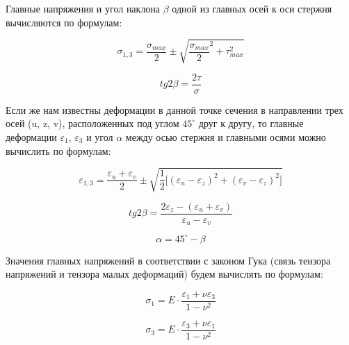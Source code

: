 \documentclass[12pt, a4paper]{article}
\begin{document}
    Главные напряжения и угол наклона $\beta$ одной из главных осей к оси стержня вычисляются по формулам:
    
    \begin{equation}
        \sigma_{1,3} = \frac{\sigma_{max}}{2} \pm \sqrt{\frac{\sigma_{max}}{2}^{2} + \tau_{max}^{2}}
        \label{eq3}
    \end{equation}
    
    \begin{equation}
        tg2\beta = \frac{2\tau}{\sigma}
        \label{eq4}
    \end{equation}
    
    Если же нам известны деформации в данной точке сечения в направлении трех осей (u, z, v), расположенных под углом $45^{\circ}$ друг к другу, то главные деформации $\varepsilon_{1}$, $\varepsilon_{3}$ и угол $\alpha$ между осью стержня и главными осями можно вычислить по формулам:
    
    \begin{equation}
        \varepsilon_{1,3} = \frac{\varepsilon_{u} + \varepsilon_{v}}{2} \pm \sqrt{\frac{1}{2} \Big[ (\varepsilon_{u} - \varepsilon_{z})^{2} + (\varepsilon_{v} - \varepsilon_{z})^{2} \Big]}
        \label{eq5}
    \end{equation}
    
    \begin{equation}
        tg2\beta = \frac{2\varepsilon_{z} - (\varepsilon_{u} + \varepsilon_{v})}{\varepsilon_{u} - \varepsilon_{v}}
        \label{eq6}
    \end{equation}
    
    \begin{equation}
        \alpha = 45^{\circ} - \beta
        \label{eq7}
    \end{equation}
    
    Значения главных напряжений в соответствии с законом Гука (связь тензора напряжений и тензора малых деформаций) будем вычислять по формулам:
    
    \begin{equation}
        \sigma_{1} = E \cdot \frac{\varepsilon_{1} + \nu \varepsilon_{3}}{1 - \nu^{2}}
        \label{eq8}
    \end{equation}
    
    \begin{equation}
        \sigma_{3} = E \cdot \frac{\varepsilon_{3} + \nu \varepsilon_{1}}{1 - \nu^{2}}
        \label{eq9}
    \end{equation}
    
\end{document}
